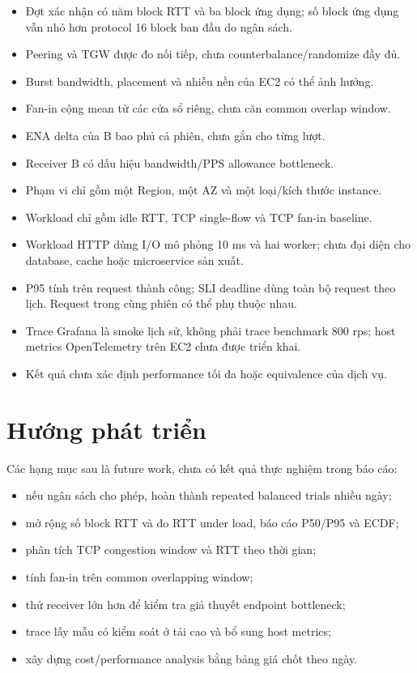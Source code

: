 \begin{itemize}
  \item Đợt xác nhận có năm block RTT và ba block ứng dụng; số block ứng dụng
        vẫn nhỏ hơn protocol 16 block ban đầu do ngân sách.
  \item Peering và TGW được đo nối tiếp, chưa counterbalance/randomize đầy đủ.
  \item Burst bandwidth, placement và nhiễu nền của EC2 có thể ảnh hưởng.
  \item Fan-in cộng mean từ các cửa sổ riêng, chưa căn common overlap window.
  \item ENA delta của B bao phủ cả phiên, chưa gắn cho từng lượt.
  \item Receiver B có dấu hiệu bandwidth/PPS allowance bottleneck.
  \item Phạm vi chỉ gồm một Region, một AZ và một loại/kích thước instance.
  \item Workload chỉ gồm idle RTT, TCP single-flow và TCP fan-in baseline.
  \item Workload HTTP dùng I/O mô phỏng 10 ms và hai worker; chưa đại diện cho
        database, cache hoặc microservice sản xuất.
  \item P95 tính trên request thành công; SLI deadline dùng toàn bộ request theo
        lịch. Request trong cùng phiên có thể phụ thuộc nhau.
  \item Trace Grafana là smoke lịch sử, không phải trace benchmark 800 rps;
        host metrics OpenTelemetry trên EC2 chưa được triển khai.
  \item Kết quả chưa xác định performance tối đa hoặc equivalence của dịch vụ.
\end{itemize}

\section{Hướng phát triển}

Các hạng mục sau là future work, chưa có kết quả thực nghiệm trong báo cáo:

\begin{itemize}
  \item nếu ngân sách cho phép, hoàn thành repeated balanced trials nhiều ngày;
  \item mở rộng số block RTT và đo RTT under load, báo cáo P50/P95 và ECDF;
  \item phân tích TCP congestion window và RTT theo thời gian;
  \item tính fan-in trên common overlapping window;
  \item thử receiver lớn hơn để kiểm tra giả thuyết endpoint bottleneck;
  \item trace lấy mẫu có kiểm soát ở tải cao và bổ sung host metrics;
  \item xây dựng cost/performance analysis bằng bảng giá chốt theo ngày.
\end{itemize}

